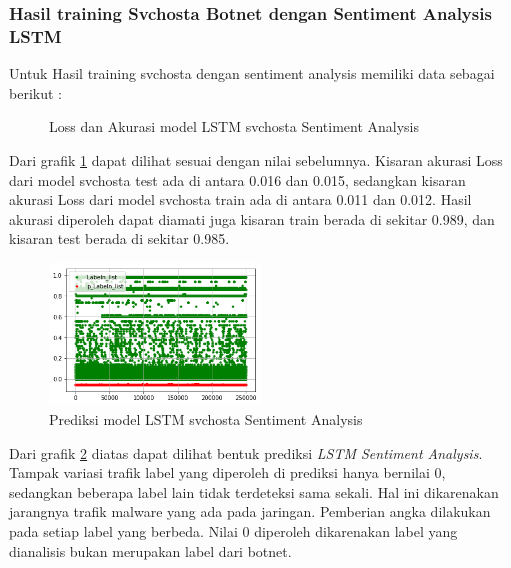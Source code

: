 \documentclass[./skripsi.tex]{subfiles}
\begin{document}
\subsubsection{Hasil training Svchosta Botnet dengan Sentiment Analysis LSTM}
\par Untuk Hasil training svchosta dengan sentiment analysis memiliki data sebagai berikut :
\begin{figure}[H]
    \centering
    \caption{Loss dan Akurasi model LSTM svchosta Sentiment Analysis}
    \label{fig:lstms_svchosta}
\end{figure}

\par Dari grafik \ref{fig:lstms_svchosta} dapat dilihat sesuai dengan nilai sebelumnya. Kisaran akurasi Loss dari model svchosta test ada di antara 0.016 dan 0.015, sedangkan kisaran akurasi Loss dari model svchosta train ada di antara 0.011 dan 0.012. Hasil akurasi diperoleh dapat diamati juga kisaran train berada di sekitar 0.989, dan kisaran test berada di sekitar 0.985.

\begin{figure}[H]
    \centering
    \includegraphics[width=0.5\textwidth]{public/assets/img/lstms_svchosta_pred.png}
    \caption{Prediksi model LSTM svchosta Sentiment Analysis}
    \label{fig:lstms_svchosta_pred}
\end{figure}

\par Dari grafik \ref{fig:lstms_svchosta_pred} diatas dapat dilihat bentuk prediksi \textit{LSTM Sentiment Analysis}. Tampak variasi trafik label yang diperoleh di prediksi hanya bernilai 0, sedangkan beberapa label lain tidak terdeteksi sama sekali. Hal ini dikarenakan jarangnya trafik malware yang ada pada jaringan. Pemberian angka dilakukan pada setiap label yang berbeda. Nilai 0 diperoleh dikarenakan label yang dianalisis bukan merupakan label dari botnet.
\end{document}
